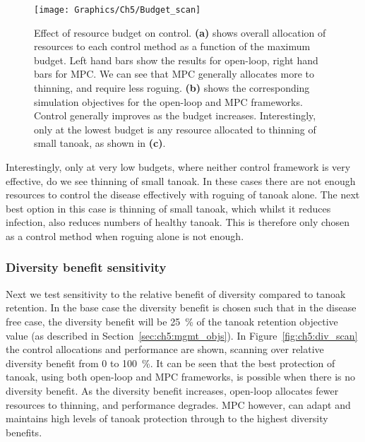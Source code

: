 \begin{figure}
    \begin{center}
        \texttt{[image: Graphics/Ch5/Budget\_scan]}
        \caption[Varying the control budget]{Effect of resource budget on control. \textbf{(a)} shows overall allocation of resources to each control method as a function of the maximum budget. Left hand bars show the results for open-loop, right hand bars for MPC\@. We can see that MPC generally allocates more to thinning, and require less roguing. \textbf{(b)} shows the corresponding simulation objectives for the open-loop and MPC frameworks. Control generally improves as the budget increases. Interestingly, only at the lowest budget is any resource allocated to thinning of small tanoak, as shown in \textbf{(c)}.\label{fig:ch5:budget_scan}}
    \end{center}
\end{figure}

Interestingly, only at very low budgets, where neither control framework is very effective, do we see thinning of small tanoak. In these cases there are not enough resources to control the disease effectively with roguing of tanoak alone. The next best option in this case is thinning of small tanoak, which whilst it reduces infection, also reduces numbers of healthy tanoak. This is therefore only chosen as a control method when roguing alone is not enough.

\subsubsection{Diversity benefit sensitivity}\label{sec:ch5:div_scan}

Next we test sensitivity to the relative benefit of diversity compared to tanoak retention. In the base case the diversity benefit is chosen such that in the disease free case, the diversity benefit will be \SI{25}{\percent} of the tanoak retention objective value (as described in Section~\ref{sec:ch5:mgmt_objs}). In Figure~\ref{fig:ch5:div_scan} the control allocations and performance are shown, scanning over relative diversity benefit from 0 to \SI{100}{\percent}. It can be seen that the best protection of tanoak, using both open-loop and MPC frameworks, is possible when there is no diversity benefit. As the diversity benefit increases, open-loop allocates fewer resources to thinning, and performance degrades. MPC however, can adapt and maintains high levels of tanoak protection through to the highest diversity benefits.


